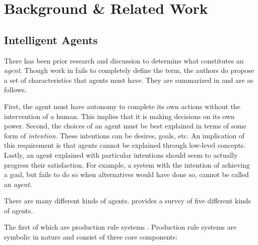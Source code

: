\chapter{Background \& Related Work}
\label{ch:background}

%
%
%

\section{Intelligent Agents}
\label{sec:agents}

There has been prior research and discussion to determine what constitutes an \textit{agent}.
Though work in \cite{wooldridge_agent_1995} fails to completely define the term,
the authors do propose a set of characteristics that agents must have.
They are summarized in \cite{dignum_intentional_1998} and are as follows.

First, the agent must have autonomy to complete its own actions without the intervention of a human.
This implies that it is making decisions on its own power.
Second, the choices of an agent must be best explained in terms of some form of \textit{intention}.
These intentions can be desires, goals, etc.
An implication of this requirement is that agents cannot be explained through low-level concepts.
Lastly, an agent explained with particular intentions should seem to actually progress their satisfaction.
For example, a system with the intention of achieving a goal,
but fails to do so when alternatives would have done so, cannot be called an \textit{agent}.

There are many different kinds of agents.
\cite{balke_how_2014} provides a survey of five different kinds of agents.

The first of which are production rule systems \cite{balke_how_2014}.
Production rule systems are symbolic in nature and
consist of three core components:

